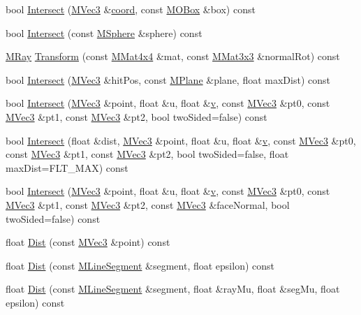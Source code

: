\begin{CompactItemize}
bool \hyperlink{class_m_ray_31a2e259d2ce5afbe1c7ee8cbcc60e63}{Intersect} (\hyperlink{class_m_vec3}{MVec3} \&\hyperlink{glext__bak_8h_4ad6f000813afde2b5727cbfdddc75be}{coord}, const \hyperlink{class_m_o_box}{MOBox} \&box) const 
\item 
bool \hyperlink{class_m_ray_ec4c564ad95eae52d3113431b89e1196}{Intersect} (const \hyperlink{class_m_sphere}{MSphere} \&sphere) const 
\item 
\hyperlink{class_m_ray}{MRay} \hyperlink{class_m_ray_7cd16f0d5b6882ebc5cf2f381af6e02a}{Transform} (const \hyperlink{class_m_mat4x4}{MMat4x4} \&mat, const \hyperlink{class_m_mat3x3}{MMat3x3} \&normalRot) const 
\item 
bool \hyperlink{class_m_ray_e8b4fd4410de61bd1e3d8db92e0bcbb7}{Intersect} (\hyperlink{class_m_vec3}{MVec3} \&hitPos, const \hyperlink{class_m_plane}{MPlane} \&plane, float maxDist) const 
\item 
bool \hyperlink{class_m_ray_ad9ff091b32845ef02aab6baa1bed1b1}{Intersect} (\hyperlink{class_m_vec3}{MVec3} \&point, float \&u, float \&\hyperlink{glext__bak_8h_5cf89b94f7478c0ebc4429b60e7ef93b}{v}, const \hyperlink{class_m_vec3}{MVec3} \&pt0, const \hyperlink{class_m_vec3}{MVec3} \&pt1, const \hyperlink{class_m_vec3}{MVec3} \&pt2, bool twoSided=false) const 
\item 
bool \hyperlink{class_m_ray_5c809d98738674e546cc254e931ebe36}{Intersect} (float \&dist, \hyperlink{class_m_vec3}{MVec3} \&point, float \&u, float \&\hyperlink{glext__bak_8h_5cf89b94f7478c0ebc4429b60e7ef93b}{v}, const \hyperlink{class_m_vec3}{MVec3} \&pt0, const \hyperlink{class_m_vec3}{MVec3} \&pt1, const \hyperlink{class_m_vec3}{MVec3} \&pt2, bool twoSided=false, float maxDist=FLT\_\-MAX) const 
\item 
bool \hyperlink{class_m_ray_773aeaf4f6aada0dfdc59da124e483ae}{Intersect} (\hyperlink{class_m_vec3}{MVec3} \&point, float \&u, float \&\hyperlink{glext__bak_8h_5cf89b94f7478c0ebc4429b60e7ef93b}{v}, const \hyperlink{class_m_vec3}{MVec3} \&pt0, const \hyperlink{class_m_vec3}{MVec3} \&pt1, const \hyperlink{class_m_vec3}{MVec3} \&pt2, const \hyperlink{class_m_vec3}{MVec3} \&faceNormal, bool twoSided=false) const 
\item 
float \hyperlink{class_m_ray_258330bce7cfc69daff8f337e3a92215}{Dist} (const \hyperlink{class_m_vec3}{MVec3} \&point) const 
\item 
float \hyperlink{class_m_ray_1b6c914026833000ea9760f177a2f890}{Dist} (const \hyperlink{class_m_line_segment}{MLineSegment} \&segment, float epsilon) const 
\item 
float \hyperlink{class_m_ray_1500542719a23ff8e159e20c0e4cd350}{Dist} (const \hyperlink{class_m_line_segment}{MLineSegment} \&segment, float \&rayMu, float \&segMu, float epsilon) const 
\end{CompactItemize}


